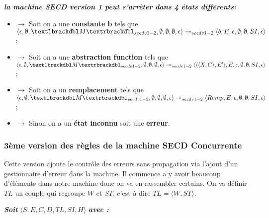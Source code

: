 \documentclass[10pt,a4paper]{report}
\begin{document}
\textbf{\textit{la machine SECD version 1 peut s'arrêter dans 4 états différents:}}
\smallbreak
\begin{itemize}
\item[]$\longrightarrow$ Soit on a une \textbf{constante b} tels que $\langle \epsilon,\emptyset,\textlbrackdbl M\textrbrackdbl_{secdv1-2},\emptyset,\emptyset,\emptyset,\epsilon\rangle \twoheadrightarrow_{secdv1-2} \langle b,E,\epsilon,\emptyset,\emptyset,SI,\epsilon\rangle$;
\item[]$\longrightarrow$ Soit on a une \textbf{abstraction function} tels que $\langle \epsilon,\emptyset,\textlbrackdbl M\textrbrackdbl_{secdv1-2},\emptyset,\emptyset,\emptyset,\epsilon\rangle \twoheadrightarrow_{secdv1-2} \langle\langle\langle X,C\rangle,E'\rangle,E,\epsilon,\emptyset,\emptyset,SI,\epsilon\rangle$;
\item[]$\longrightarrow$ Soit on a un \textbf{remplacement} tels que $\langle \epsilon,\emptyset,\textlbrackdbl M\textrbrackdbl_{secdv1-2},\emptyset,\emptyset,\emptyset,\epsilon\rangle \twoheadrightarrow_{secdv1-2} \langle Remp,E,\epsilon,\emptyset,\emptyset,SI,\epsilon\rangle$;
\item[]$\longrightarrow$ Sinon on a un \textbf{état inconnu} soit une \textbf{erreur}.
\end{itemize}
\newpage


\subsubsection{3ème version des règles de la machine SECD Concurrente}\label{SECDConc3}
\smallbreak
Cette version ajoute le contrôle des erreurs sans propagation via l'ajout d'un gestionnaire d'erreur dans la machine. Il commence a y avoir beaucoup d'éléments dans notre machine donc on va en rassembler certains. On va définir $TL$ un couple qui regroupe $W$ et $ST$, c'est-à-dire $TL = \langle W,ST\rangle$.
\bigbreak

\textbf{\textit{Soit}} $\langle S,E,C,D,TL,SI,H\rangle$ \textbf{\textit{avec :}}
\end{document}
